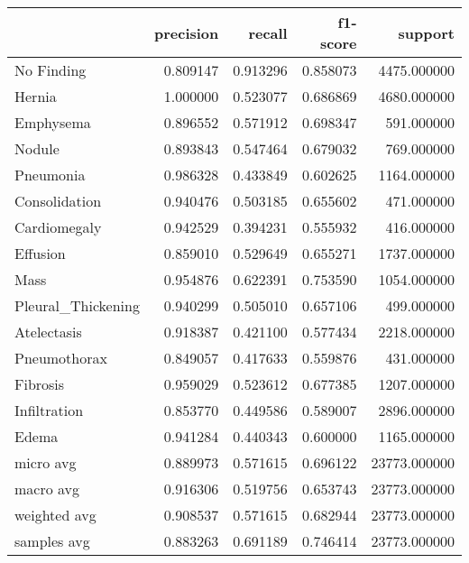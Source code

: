 \begin{tabular}{lrrrr}
\toprule
 & precision & recall & f1-score & support \\
\midrule
No Finding & 0.809147 & 0.913296 & 0.858073 & 4475.000000 \\
Hernia & 1.000000 & 0.523077 & 0.686869 & 4680.000000 \\
Emphysema & 0.896552 & 0.571912 & 0.698347 & 591.000000 \\
Nodule & 0.893843 & 0.547464 & 0.679032 & 769.000000 \\
Pneumonia & 0.986328 & 0.433849 & 0.602625 & 1164.000000 \\
Consolidation & 0.940476 & 0.503185 & 0.655602 & 471.000000 \\
Cardiomegaly & 0.942529 & 0.394231 & 0.555932 & 416.000000 \\
Effusion & 0.859010 & 0.529649 & 0.655271 & 1737.000000 \\
Mass & 0.954876 & 0.622391 & 0.753590 & 1054.000000 \\
Pleural_Thickening & 0.940299 & 0.505010 & 0.657106 & 499.000000 \\
Atelectasis & 0.918387 & 0.421100 & 0.577434 & 2218.000000 \\
Pneumothorax & 0.849057 & 0.417633 & 0.559876 & 431.000000 \\
Fibrosis & 0.959029 & 0.523612 & 0.677385 & 1207.000000 \\
Infiltration & 0.853770 & 0.449586 & 0.589007 & 2896.000000 \\
Edema & 0.941284 & 0.440343 & 0.600000 & 1165.000000 \\
micro avg & 0.889973 & 0.571615 & 0.696122 & 23773.000000 \\
macro avg & 0.916306 & 0.519756 & 0.653743 & 23773.000000 \\
weighted avg & 0.908537 & 0.571615 & 0.682944 & 23773.000000 \\
samples avg & 0.883263 & 0.691189 & 0.746414 & 23773.000000 \\
\bottomrule
\end{tabular}
